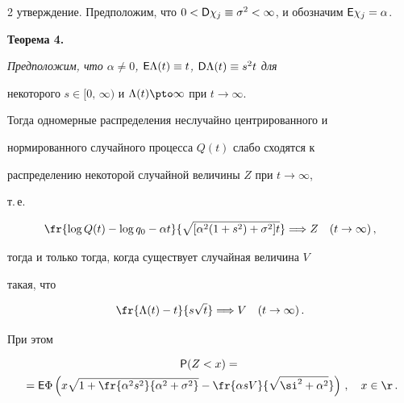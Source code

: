 \begin{multicols}{2}
утверждение. Предположим, что $0<{\sf


D}\chi_j\equiv\sigma^2<\infty$, и обозначим ${\sf E}\chi_j=\alpha$.





\smallskip





\noindent


{\textbf{Теорема 4.}} {\it Предположим, что $\alpha\neq 0$, ${\sf


E}\Lambda(t) \equiv t$,  ${\sf D}\Lambda(t)\equiv s^2t$ для


некоторого $s\in[0,\, \infty)$ и $\Lambda(t)\pto\infty$ при $t\to\infty$.


Тогда одномерные распределения неслучайно центрированного и


нормированного случайного процесса $Q(t)$ слабо сходятся к


распределению некоторой случайной величины $Z$ при $t\to\infty$,


т.\,е.\


$$


\fr{\log Q(t)-\log q_0-\alpha


t}{\sqrt{[\alpha^2(1+s^2)+\sigma^2]t}}\Longrightarrow Z\ \ \


(t\to\infty)\,,


$$


тогда и только тогда, когда существует случайная величина $V$


такая, что


$$


\fr{\Lambda(t)-t}{s\sqrt t}\Longrightarrow V\ \ \ (t\to\infty)\,.


$$


При этом}


\begin{multline*}


{\sf P}(Z<x)={}\\


{}={\sf


E}\Phi\left(x\sqrt{1+\fr{\alpha^2s^2}{\alpha^2+\sigma^2}}-\fr{\alpha


sV}{\sqrt{\si^2+\alpha^2}}\right)\,,\ \ \ x\in\r\,.


\end{multline*}





\smallskip






\end{multicols}
